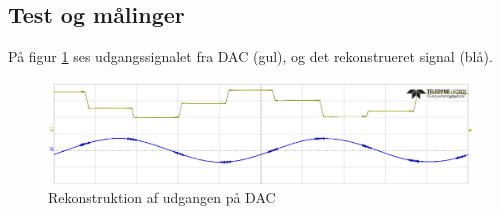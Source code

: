 \subsection{Test og målinger}
På figur \ref{fig::anfilter_recon} ses udgangssignalet fra DAC (gul), og det rekonstrueret signal (blå).
\begin{figure}[h!]
	\centering
	\includegraphics[scale = 0.4]{./billeder/reconstruction}
	\caption{Rekonstruktion af udgangen på DAC}
	\label{fig::anfilter_recon}
\end{figure}
\FloatBlock

